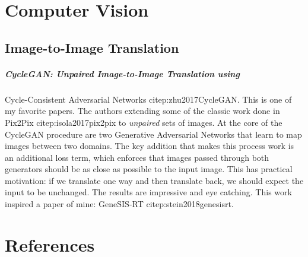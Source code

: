 \documentclass[12pt]{article}
\author{Justin Kaipada}
\date{\today}
\title{}
\begin{document}
\tableofcontents


\section{Computer Vision}
\label{sec:org8c8685b}
\subsection{Image-to-Image Translation}
\label{sec:org48ab987}
\subparagraph{CycleGAN: Unpaired Image-to-Image Translation using}
\label{sec:org9001b90}
Cycle-Consistent Adversarial Networks citep:zhu2017CycleGAN.
This is one of my favorite papers. The authors extending some
of the classic work done in Pix2Pix citep:isola2017pix2pix to
\emph{unpaired} sets of images. At the core of the CycleGAN
procedure are two Generative Adversarial Networks that learn
to map images between two domains. The key addition that makes
this process work is an additional loss term, which enforces
that images passed through both generators should be as close
as possible to the input image. This has practical motivation:
if we translate one way and then translate back, we should
expect the input to be unchanged. The results are impressive
and eye catching. This work inspired a paper of mine:
GeneSIS-RT citep:stein2018genesisrt.

\section*{References}
\label{sec:org1d6d401}
\printbibliography[heading=none]
\end{document}
